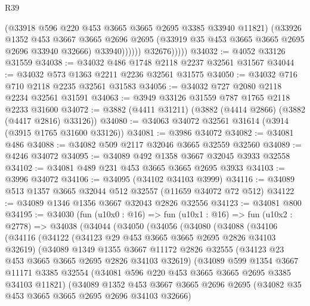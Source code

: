 \begin{lexlean}{R39}
\begin{coremodule}
                        (@33918 @596 @220 @453 @3665 @3665 @2695 @3385 @33940 @11821)
                        (@33926
                          @1352
                          @453
                          @3667
                          @3665
                          @2696
                          @2695
                          (@33919 @35 @453 @3665 @3665 @2695 @2696 @33940 @32666)
                          @33940))))))
              @32676)))))
@34032 := @4052 @33126 @31559
@34038 := @34032 @486 @1748 @2118 @2237 @32561 @31567
@34044 := @34032 @573 @1363 @2211 @2236 @32561 @31575
@34050 := @34032 @716 @710 @2118 @2235 @32561 @31583
@34056 := @34032 @727 @2080 @2118 @2234 @32561 @31591
@34063 := @3949 @33126 @31559 @787 @1765 @2118 @2233 @31600
@34072 := @3882 (@4411 @31211) (@3882 (@4414 @2866) (@3882 (@4417 @2816) @33126))
@34080 := @34063 @34072 @32561 @31614 (@3914 (@3915 @1765 @31600 @33126))
@34081 := @3986 @34072
@34082 := @34081 @486
@34088 := @34082 @509 @2117 @32046 @3665 @32559 @32560
@34089 := @4246 @34072
@34095 := @34089 @492 @1358 @3667 @32045 @3933 @32558
@34102 := @34081 @489 @231 @453 @3665 @3665 @2695 @3933
@34103 := @3996 @34072
@34106 := @34095 (@34102 @34103 @3999)
@34116 := @34089 @513 @1357 @3665 @32044 @512 @32557 (@11659 @34072 @72 @512)
@34122 := @34089 @1346 @1356 @3667 @32043 @2826 @32556
@34123 := @34081 @800
@34195 := @34030
    (fun (u10x0 : @16) =>
    fun (u10x1 : @16) =>
    fun (u10x2 : @2778) =>
    @34038
      (@34044
        (@34050
          (@34056
            (@34080
              (@34088
                (@34106
                  (@34116
                    (@34122
                      (@34123 @29 @453 @3665 @3665 @2695 @2826 @34103 @32619)
                      (@34089
                        @1349
                        @1355
                        @3667
                        @11172
                        @2826
                        @32555
                        (@34123 @23 @453 @3665 @3665 @2695 @2826 @34103 @32619)
                        (@34089
                          @599
                          @1354
                          @3667
                          @11171
                          @3385
                          @32554
                          (@34081 @596 @220 @453 @3665 @3665 @2695 @3385 @34103 @11821)
                          (@34089
                            @1352
                            @453
                            @3667
                            @3665
                            @2696
                            @2695
                            (@34082 @35 @453 @3665 @3665 @2695 @2696 @34103 @32666)

\end{coremodule}
\end{lexlean}
